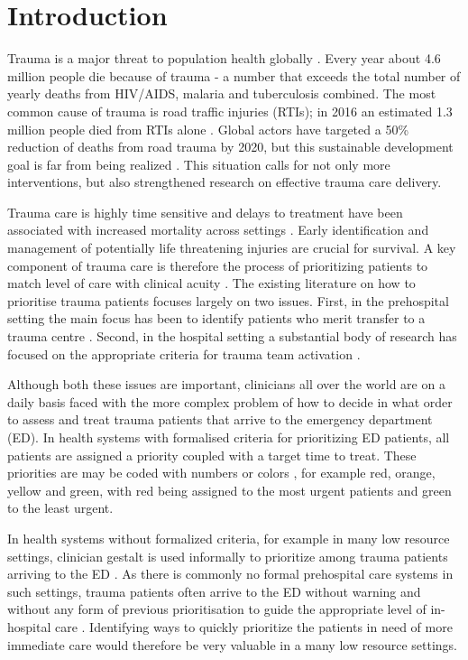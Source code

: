 \documentclass[10pt,letterpaper]{article}\usepackage[]{graphicx}\usepackage[]{color}
\begin{document}
\section*{Introduction}
Trauma is a major threat to population health globally
\cite{Brohi2017,GBD2017}. Every year about 4.6 million people die because of
trauma - a number that exceeds the total number of yearly deaths from HIV/AIDS,
malaria and tuberculosis combined. The most common cause of trauma is road
traffic injuries (RTIs); in 2016 an estimated 1.3 million people died from RTIs
alone \cite{GBD2017}. Global actors have targeted a 50\% reduction of deaths
from road trauma by 2020, but this sustainable development goal is far from
being realized \cite{UN2018}. This situation calls for not only more
interventions, but also strengthened research on effective trauma care delivery.

Trauma care is highly time sensitive and delays to treatment have been
associated with increased mortality across settings
\cite{Yeboah2014,OReilly2013,Roy2017a}. Early identification and management of
potentially life threatening injuries are crucial for survival. A key component
of trauma care is therefore the process of prioritizing patients to match level
of care with clinical acuity \cite{EAST2010,NICE2016}. The existing literature
on how to prioritise trauma patients focuses largely on two issues. First, in
the prehospital setting the main focus has been to identify patients who merit
transfer to a trauma centre \cite{Voskens2018}. Second, in the hospital setting
a substantial body of research has focused on the appropriate criteria for
trauma team activation \cite{VanRein2018,Tignanelli2018}.

Although both these issues are important, clinicians all over the world are on a
daily basis faced with the more complex problem of how to decide in what order
to assess and treat trauma patients that arrive to the emergency department
(ED). In health systems with formalised criteria for prioritizing ED patients,
all patients are assigned a priority coupled with a target time to treat. These
priorities are may be coded with numbers \cite{ESI2012} or colors
\cite{SATG2012}, for example red, orange, yellow and green, with red being
assigned to the most urgent patients and green to the least urgent.

In health systems without formalized criteria, for example in many low resource
settings, clinician gestalt is used informally to prioritize among trauma
patients arriving to the ED \cite{Baker2013}. As there is commonly no formal
prehospital care systems in such settings, trauma patients often arrive to the
ED without warning and without any form of previous prioritisation to guide the
appropriate level of in-hospital care \cite{Choi2017}. Identifying ways to
quickly prioritize the patients in need of more immediate care would therefore
be very valuable in a many low resource settings.
\end{document}
